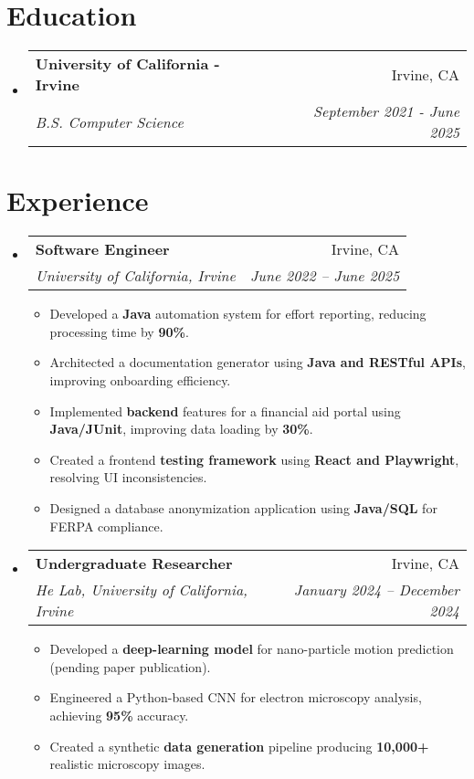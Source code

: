 \documentclass[letterpaper,11pt]{article}
\makeatletter
\newcommand{\resumeItem}[1]{
  \item\small{
    {#1 \vspace{-1pt}}
  }
}
\newcommand{\resumeSubheading}[4]{
  \vspace{-2pt}\item
    \begin{tabular*}{0.97\textwidth}[t]{l@{\extracolsep{\fill}}r}
      \textbf{#1} & #2 \\
      \textit{\small#3} & \textit{\small #4} \\
    \end{tabular*}\vspace{-5pt}
}
\newcommand{\resumeSubHeadingListStart}{\begin{itemize}[leftmargin=0.15in, label={}]}
\newcommand{\resumeSubHeadingListEnd}{\end{itemize}}
\newcommand{\resumeItemListStart}{\begin{itemize}}
\newcommand{\resumeItemListEnd}{\end{itemize}\vspace{-5pt}}
\makeatother
\begin{document}
\section{Education}
  \resumeSubHeadingListStart
    \resumeSubheading
      {University of California - Irvine}{Irvine, CA}
      {B.S. Computer Science}{September 2021 - June 2025}
  \resumeSubHeadingListEnd
  
\section{Experience}
  \resumeSubHeadingListStart
    \resumeSubheading
      {Software Engineer}{Irvine, CA}
      {University of California, Irvine}{June 2022 -- June 2025}
      \resumeItemListStart
        \resumeItem{Developed a \textbf{Java} automation system for effort reporting, reducing processing time by \textbf{90\%}.}
        \resumeItem{Architected a documentation generator using \textbf{Java and RESTful APIs}, improving onboarding efficiency.}
        \resumeItem{Implemented \textbf{backend} features for a financial aid portal using \textbf{Java/JUnit}, improving data loading by \textbf{30\%}.}
        \resumeItem{Created a frontend \textbf{testing framework} using \textbf{React and Playwright}, resolving UI inconsistencies.}
        \resumeItem{Designed a database anonymization application using \textbf{Java/SQL} for FERPA compliance.}
      \resumeItemListEnd
    \resumeSubheading
      {Undergraduate Researcher}{Irvine, CA}
      {He Lab, University of California, Irvine}{January 2024 -- December 2024}
      \resumeItemListStart
        \resumeItem{Developed a \textbf{deep-learning model} for nano-particle motion prediction (pending paper publication).}
        \resumeItem{Engineered a Python-based CNN for electron microscopy analysis, achieving \textbf{95\%} accuracy.}
        \resumeItem{Created a synthetic \textbf{data generation} pipeline producing \textbf{10,000+} realistic microscopy images.}
      \resumeItemListEnd
  \resumeSubHeadingListEnd
\end{document}
